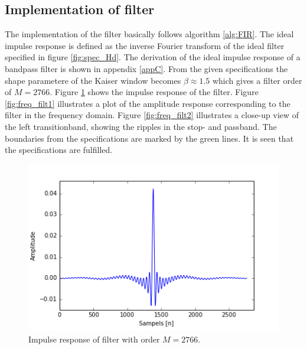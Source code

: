 \subsection{Implementation of filter}
The implementation of the filter basically follows algorithm \ref{alg:FIR}. The ideal impulse response is defined as the inverse Fourier transform of the ideal filter specified in figure \ref{fig:spec_Hd}. The derivation of the ideal impulse response of a bandpass filter is shown in appendix \ref{appC}. From the given specifications the shape parametere of the Kaiser window becomes $\beta \approx 1.5$ which gives a filter order of $M=2766$. Figure \ref{fig:FIRimpulse} shows the impulse response of the filter. Figure \ref{fig:freq_filt1} illustrates a plot of the amplitude response corresponding to the filter in the frequency domain. Figure \ref{fig:freq_filt2} illustrates a close-up view of the left transitionband, showing the ripples in the stop- and passband. The boundaries from the specifications are marked by the green lines. It is seen that the specifications are fulfilled. 
\begin{figure}[h]
\centering 
\includegraphics[scale=0.5]{figures/filtertest/impulse.png}
\caption{Impulse response of filter with order $M=2766$.}
\label{fig:FIRimpulse}
\end{figure}
       
